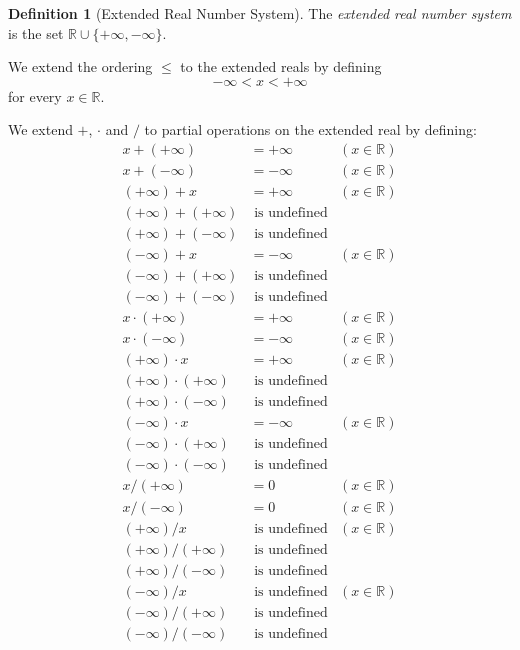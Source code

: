 \documentclass{book}
\theoremstyle{definition}
\newtheorem{df}[prop]{Definition}
\begin{document}
\begin{df}[Extended Real Number System]
The \emph{extended real number system} is the set $\mathbb{R} \cup \{ + \infty, - \infty \}$.

We extend the ordering $\leq$ to the extended reals by defining
\[ - \infty < x < + \infty \]
for every $x \in \mathbb{R}$.

We extend $+$, $\cdot$ and $/$ to partial operations on the extended real by defining:
\begin{align*} 
x + (+\infty) & = + \infty & (x \in \mathbb{R}) \\
x + (- \infty) & = - \infty & (x \in \mathbb{R}) \\
(+ \infty) + x & = + \infty & (x \in \mathbb{R}) \\
(+ \infty) + (+ \infty) & \text{ is undefined} \\
(+ \infty) + (- \infty) & \text{ is undefined} \\
(- \infty) + x & = - \infty & (x \in \mathbb{R}) \\
(- \infty) + (+ \infty) & \text{ is undefined} \\
(- \infty) + (- \infty) & \text{ is undefined} \\
x \cdot (+ \infty) & = + \infty & (x \in \mathbb{R}) \\
x \cdot (- \infty) & = - \infty & (x \in \mathbb{R}) \\
(+ \infty) \cdot x & = + \infty & (x \in \mathbb{R}) \\
(+ \infty) \cdot (+ \infty) & \text{ is undefined} \\
(+ \infty) \cdot (- \infty) & \text{ is undefined} \\
(- \infty) \cdot x & = - \infty & (x \in \mathbb{R}) \\
(- \infty) \cdot (+ \infty) & \text{ is undefined} \\
(- \infty) \cdot (- \infty) & \text{ is undefined} \\
x / (+ \infty) & = 0 & (x \in \mathbb{R}) \\
x / (- \infty) & = 0 & (x \in \mathbb{R}) \\
(+ \infty) / x & \text{ is undefined} & (x \in \mathbb{R}) \\
(+ \infty) / (+ \infty) & \text{ is undefined} \\
(+ \infty) / (- \infty) & \text{ is undefined} \\
(- \infty) / x & \text{ is undefined} & (x \in \mathbb{R}) \\
(- \infty) / (+ \infty) & \text{ is undefined} \\
(- \infty) / (- \infty) & \text{ is undefined}
\end{align*}
\end{df}
\end{document}
